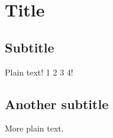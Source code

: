 \documentclass{article}
\begin{document}
\section{Title}

\subsection{Subtitle}

Plain text!
1
2
3
4!

\subsection{Another subtitle}

More plain text.
\end{document}
